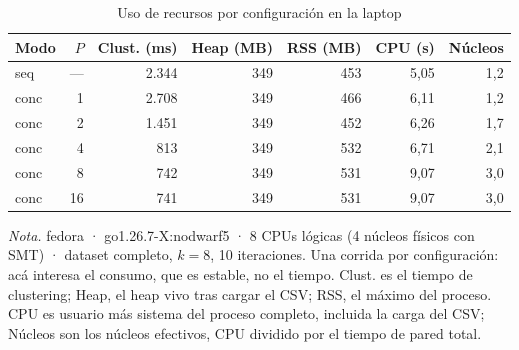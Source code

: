 \begin{table}[H]
\caption{Uso de recursos por configuración en la laptop}\label{tab:recursos}
\footnotesize
\begin{tabular}{@{}lrrrrrr@{}}
\toprule
\textbf{Modo} & \textbf{$P$} & \textbf{Clust. (ms)} & \textbf{Heap (MB)} & \textbf{RSS (MB)} & \textbf{CPU (s)} & \textbf{Núcleos} \\
\midrule
seq & --- & 2.344 & 349 & 453 & 5,05 & 1,2 \\
conc & 1 & 2.708 & 349 & 466 & 6,11 & 1,2 \\
conc & 2 & 1.451 & 349 & 452 & 6,26 & 1,7 \\
conc & 4 & 813 & 349 & 532 & 6,71 & 2,1 \\
conc & 8 & 742 & 349 & 531 & 9,07 & 3,0 \\
conc & 16 & 741 & 349 & 531 & 9,07 & 3,0 \\
\bottomrule
\end{tabular}

{\footnotesize\textit{Nota.} fedora · go1.26.7-X:nodwarf5 · 8 CPUs lógicas (4 núcleos físicos con SMT) · dataset completo, $k=8$, 10 iteraciones. Una corrida por configuración: acá interesa el consumo, que es estable, no el tiempo. Clust. es el tiempo de clustering; Heap, el heap vivo tras cargar el CSV; RSS, el máximo del proceso. CPU es usuario más sistema del proceso completo, incluida la carga del CSV; Núcleos son los núcleos efectivos, CPU dividido por el tiempo de pared total.\par}
\end{table}
